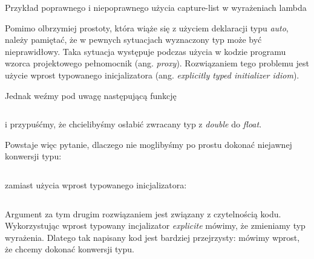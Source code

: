 \documentclass{pracamgr}
\begin{document}
\begin{listing}[H]
\inputminted[mathescape, linenos, numbersep=5pt, bgcolor=bg, rulecolor=\color{darkgray}, frame=lines, framesep=2mm]{cpp}{listings/auto.cpp}
\caption{Przykład poprawnego i niepoprawnego użycia capture-list w wyrażeniach lambda}
\label{lst:auto}
\end{listing}

Pomimo olbrzymiej prostoty, która wiąże się z użyciem deklaracji typu \textit{auto}, 
należy pamiętać, że w pewnych sytuacjach
wyznaczony typ może być nieprawidłowy. Taka sytuacja występuje podczas użycia w kodzie programu wzorca 
projektowego pełnomocnik (ang. \textit{proxy}).
Rozwiązaniem tego problemu jest użycie wprost typowanego inicjalizatora (ang. \textit{explicitly typed initializer idiom}).

Jednak weźmy pod uwagę następującą funkcję

\begin{listing}[H]
\inputminted[mathescape,  numbersep=5pt, bgcolor=bg, rulecolor=\color{darkgray}, frame=lines, framesep=2mm]{cpp}{listings/auto/auto1.cpp}  
\end{listing}

i przypuśćmy, że chcielibyśmy osłabić zwracany typ z \textit{double} do \textit{float}.

Powstaje więc pytanie, dlaczego nie moglibyśmy po prostu dokonać niejawnej konwersji typu:

\begin{listing}[H]
\inputminted[numbersep=5pt, bgcolor=bg, rulecolor=\color{darkgray}, frame=lines, framesep=2mm]{cpp}{listings/auto/auto2.cpp}  
\end{listing}

zamiast użycia wprost typowanego inicjalizatora:


\begin{listing}[H]
\inputminted[numbersep=5pt, bgcolor=bg, rulecolor=\color{darkgray}, frame=lines, framesep=2mm]{cpp}{listings/auto/auto3.cpp}  
\end{listing}

Argument za tym drugim rozwiązaniem jest związany z czytelnością kodu. Wykorzystując wprost typowany incjalizator 
\textit{explicite} mówimy, że zmieniamy typ wyrażenia. Dlatego tak napisany kod jest bardziej przejrzysty: mówimy 
wprost, że chcemy dokonać konwersji typu.
\end{document}
